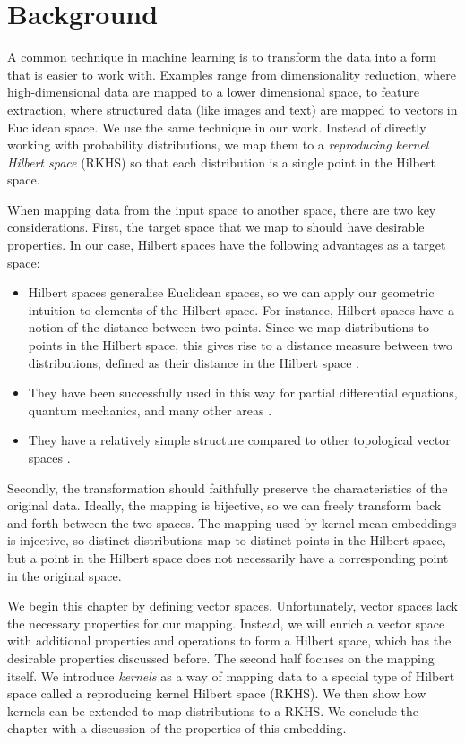 \chapter{Background}
A common technique in machine learning is to transform the data into a form that is easier to work with. Examples range from dimensionality reduction, where high-dimensional data are mapped to a lower dimensional space, to feature extraction, where structured data (like images and text) are mapped to vectors in Euclidean space. We use the same technique in our work. Instead of directly working with probability distributions, we map them to a \emph{reproducing kernel Hilbert space} (RKHS) so that each distribution is a single point in the Hilbert space.

When mapping data from the input space to another space, there are two key considerations. First, the target space that we map to should have desirable properties. In our case, Hilbert spaces have the following advantages as a target space:
%
\begin{itemize}
  \item Hilbert spaces generalise Euclidean spaces, so we can apply our geometric intuition to elements of the Hilbert space. For instance, Hilbert spaces have a notion of the distance between two points. Since we map distributions to points in the Hilbert space, this gives rise to a distance measure between two distributions, defined as their distance in the Hilbert space \needcite.
  \item They have been successfully used in this way for partial differential equations, quantum mechanics, and many other areas \needcite.
  \item They have a relatively simple structure compared to other topological vector spaces \needcite.
\end{itemize}
%
Secondly, the transformation should faithfully preserve the characteristics of the original data. Ideally, the mapping is bijective, so we can freely transform back and forth between the two spaces. The mapping used by kernel mean embeddings is injective, so distinct distributions map to distinct points in the Hilbert space, but a point in the Hilbert space does not necessarily have a corresponding point in the original space.

We begin this chapter by defining vector spaces. Unfortunately, vector spaces lack the necessary properties for our mapping. Instead, we will enrich a vector space with additional properties and operations to form a Hilbert space, which has the desirable properties discussed before. The second half focuses on the mapping itself. We introduce \emph{kernels} as a way of mapping data to a special type of Hilbert space called a reproducing kernel Hilbert space (RKHS). We then show how kernels can be extended to map distributions to a RKHS. We conclude the chapter with a discussion of the properties of this embedding.

